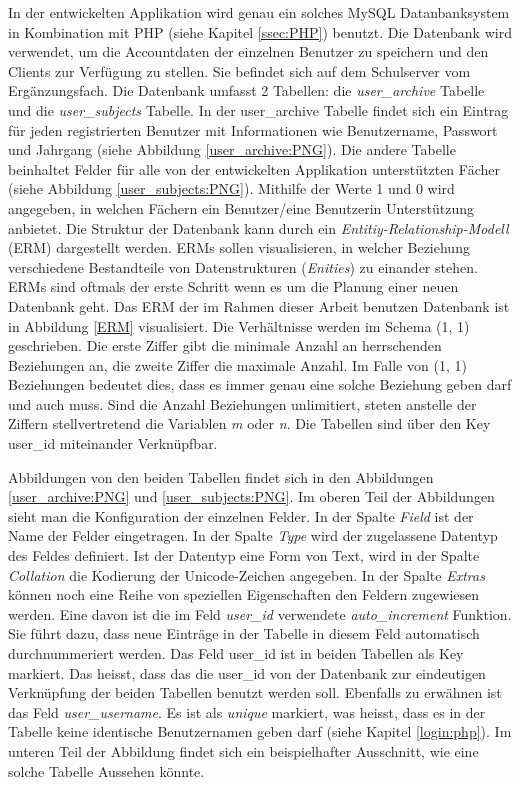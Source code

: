 \documentclass[a4paper,11pt]{report}
\begin{document}
				In der entwickelten Applikation wird genau ein solches MySQL Datanbanksystem in Kombination mit PHP (siehe Kapitel \ref{ssec:PHP}) benutzt. Die Datenbank wird verwendet, um die Accountdaten der einzelnen Benutzer zu speichern und den Clients zur Verfügung zu stellen. Sie befindet sich auf dem Schulserver vom Ergänzungsfach. Die Datenbank umfasst 2 Tabellen: die \emph{user\_archive} Tabelle und die \emph{user\_subjects} Tabelle. In der user\_archive Tabelle findet sich ein Eintrag für jeden registrierten Benutzer mit Informationen wie Benutzername, Passwort und Jahrgang (siehe Abbildung \ref{user_archive:PNG}). Die andere Tabelle beinhaltet Felder für alle von der entwickelten Applikation unterstützten Fächer (siehe Abbildung \ref{user_subjects:PNG}). Mithilfe der Werte 1 und 0 wird angegeben, in welchen Fächern ein Benutzer/eine Benutzerin Unterstützung anbietet. Die Struktur der Datenbank kann durch ein \emph{Entitiy-Relationship-Modell} (ERM) dargestellt werden. ERMs sollen visualisieren, in welcher Beziehung verschiedene Bestandteile von Datenstrukturen (\emph{Enities}) zu einander stehen. ERMs sind oftmals der erste Schritt wenn es um die Planung einer neuen Datenbank geht. Das ERM der im Rahmen dieser Arbeit benutzen Datenbank ist in Abbildung \ref{ERM} visualisiert. Die Verhältnisse werden im Schema (1, 1) geschrieben. Die erste Ziffer gibt die minimale Anzahl an herrschenden Beziehungen an, die zweite Ziffer die maximale Anzahl. Im Falle von (1, 1) Beziehungen bedeutet dies, dass es immer genau eine solche Beziehung geben darf und auch muss. Sind die Anzahl Beziehungen unlimitiert, steten anstelle der Ziffern stellvertretend die Variablen \emph{m} oder \emph{n}. Die Tabellen sind über den Key user\_id miteinander Verknüpfbar.\cite[S. 750]{IT-Handbuch} \cite{ERM} \cite{ERM2}
				
				Abbildungen von den beiden Tabellen findet sich in den Abbildungen \ref{user_archive:PNG} und \ref{user_subjects:PNG}. Im oberen Teil der Abbildungen sieht man die Konfiguration der einzelnen Felder. In der Spalte \emph{Field} ist der Name der Felder eingetragen. In der Spalte \emph{Type} wird der zugelassene Datentyp des Feldes definiert. Ist der Datentyp eine Form von Text, wird in der Spalte \emph{Collation} die Kodierung der Unicode-Zeichen angegeben. In der Spalte \emph{Extras} können noch eine Reihe von speziellen Eigenschaften den Feldern zugewiesen werden. Eine davon ist die im Feld \emph{user\_id} verwendete \emph{auto\_increment} Funktion. Sie führt dazu, dass neue Einträge in der Tabelle in diesem Feld automatisch durchnummeriert werden. Das Feld user\_id ist in beiden Tabellen als Key markiert. Das heisst, dass das die user\_id von der Datenbank zur eindeutigen Verknüpfung der beiden Tabellen benutzt werden soll. Ebenfalls zu erwähnen ist das Feld \emph{user\_username}. Es ist als \emph{unique} markiert, was heisst, dass es in der Tabelle keine identische Benutzernamen geben darf (siehe Kapitel \ref{login:php}). Im unteren Teil der Abbildung findet sich ein beispielhafter Ausschnitt, wie eine solche Tabelle Aussehen könnte.
\end{document}
